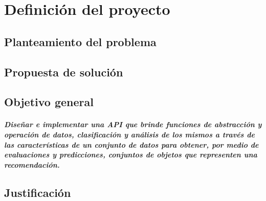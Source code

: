 \chapter {Definici\'on del proyecto}
	\section{Planteamiento del problema}
		\paragraph{}

	\section{Propuesta de solución}
		\paragraph{}
		
  \section {Objetivo general}
    \paragraph {Diseñar e implementar una API que brinde funciones de abstracción y operación de datos, clasificación y análisis de los mismos a través de las características de un conjunto de datos para obtener, por medio de evaluaciones y predicciones, conjuntos de objetos que representen una recomendación.}
  
  \section{Justificación}
